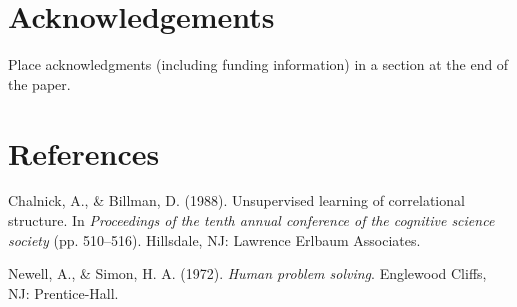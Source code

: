 \documentclass[10pt, letterpaper]{article}
\begin{document}
\section{Acknowledgements}\label{acknowledgements}

Place acknowledgments (including funding information) in a section at
the end of the paper.

\section{References}\label{references}

\setlength{\parindent}{-0.1in} \setlength{\leftskip}{0.125in} \noindent

\hypertarget{refs}{}
\hypertarget{ref-ChalnickBillman1988a}{}
Chalnick, A., \& Billman, D. (1988). Unsupervised learning of
correlational structure. In \emph{Proceedings of the tenth annual
conference of the cognitive science society} (pp. 510--516). Hillsdale,
NJ: Lawrence Erlbaum Associates.

\hypertarget{ref-NewellSimon1972a}{}
Newell, A., \& Simon, H. A. (1972). \emph{Human problem solving}.
Englewood Cliffs, NJ: Prentice-Hall.
\end{document}
